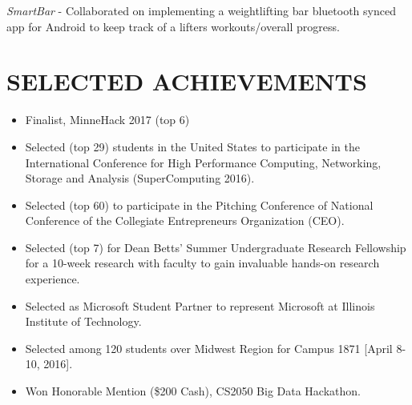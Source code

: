 \documentclass[11pt]{res}
\begin{document}
\begin{resume}
{\itshape \large SmartBar} - Collaborated on implementing a weightlifting bar bluetooth synced app for Android to keep track of a lifters workouts/overall progress.

\section{\Large {}\selectfont SELECTED ACHIEVEMENTS} 
\begin{itemize}
\item Finalist, MinneHack 2017 (top 6)
\item Selected (top 29) students in the United States to participate in the International Conference for High
Performance Computing, Networking, Storage and Analysis (SuperComputing 2016).
\item Selected (top 60) to participate in the Pitching Conference of National Conference of the Collegiate
Entrepreneurs Organization (CEO).
\item Selected (top 7) for Dean Betts’ Summer Undergraduate Research Fellowship for a 10-week research with faculty to gain invaluable hands-on research experience.
\item Selected as Microsoft Student Partner to represent Microsoft at Illinois Institute of Technology.
\item Selected among 120 students over Midwest Region for Campus 1871 [April 8-10, 2016].
\item Won Honorable Mention (\$200 Cash), CS2050 Big Data Hackathon.
\end{itemize}

\end{resume}
\end{document}
